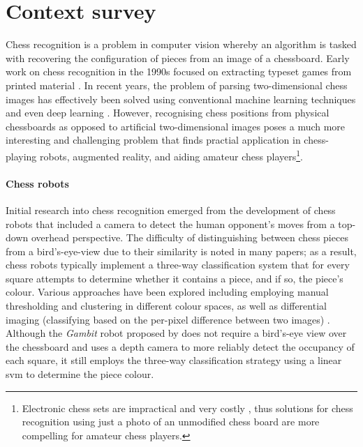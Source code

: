 \documentclass[../../main.tex]{subfiles}
\begin{document}
\section{Context survey}

Chess recognition is a problem in computer vision whereby an algorithm is tasked with recovering the configuration of pieces from an image of a chessboard.
Early work on chess recognition in the 1990s focused on extracting typeset games from printed material \cite{baird1990}. 
In recent years, the problem of parsing two-dimensional chess images has effectively been solved using conventional machine learning techniques \cite{khater2012} and even deep learning \cite{sameer2020,roy2020}.
However, recognising chess positions from physical chessboards as opposed to artificial two-dimensional images poses a much more interesting and challenging problem that finds practial application in chess-playing robots, augmented reality, and aiding amateur chess players\footnote{Electronic chess sets are impractical and very costly \cite{wang2013}, thus solutions for chess recognition using just a photo of an unmodified chess board are more compelling for amateur chess players.}.

\paragraph{Chess robots}
Initial research into chess recognition emerged from the development of chess robots that included a camera to detect the human opponent's moves from a top-down overhead perspective. 
The difficulty of distinguishing between chess pieces from a bird's-eye-view due to their similarity is noted in many papers; as a result, chess robots typically implement a three-way classification system that for every square attempts to determine whether it contains a piece, and if so, the piece's colour.
Various approaches have been explored including
  employing manual thresholding \cite{cour2002,urting2003,banerjee2012,chen2016} and clustering \cite{goncalves2005} in different colour spaces, as well as
  differential imaging (classifying based on the per-pixel difference between two images) \cite{khan2014,chen2019}.
Although the \emph{Gambit} robot proposed by \textcite{matuszek2011} does not require a bird's-eye view over the chessboard and uses a depth camera to more reliably detect the occupancy of each square, it still employs the three-way classification strategy using a linear \gls{svm} to determine the piece colour. 
\end{document}

